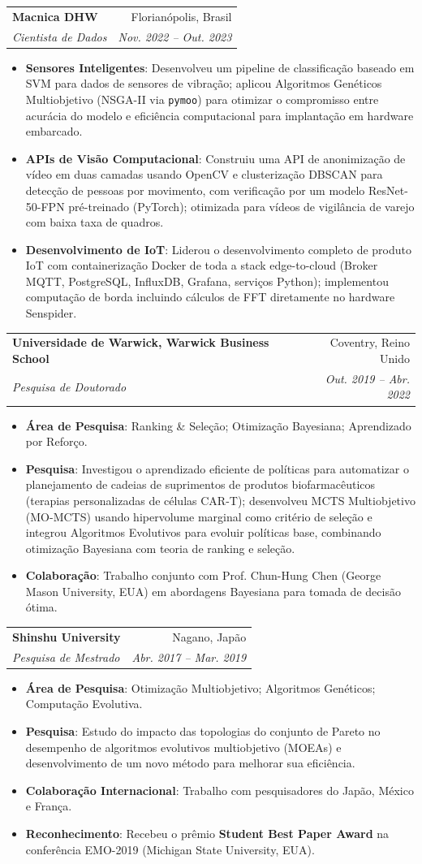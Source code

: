 \documentclass[letterpaper,11pt]{article}
\makeatletter
\newcommand{\resumeItem}[2]{
	\item\small{
		\textbf{#1}{: #2 \vspace{-2pt}}
	}
}
\newcommand{\resumeSubheading}[4]{
	\vspace {-1pt}\item
	\begin{tabular*}{0.97\textwidth}{l@{\extracolsep{\fill}}r}
		\textbf{#1} & #2\\
		\textit{\small#3} & \textit{\small #4} \\
	\end{tabular*}\vspace{-5pt}
}
\newcommand{\resumeItemListStart}{\begin{itemize} }
\newcommand{\resumeItemListEnd}{\end{itemize}\vspace{-5pt}}
\makeatother
\begin{document}
	\resumeSubheading
	{Macnica DHW}{Florianópolis, Brasil}
	{Cientista de Dados}{Nov. 2022 -- Out. 2023}
	\resumeItemListStart
	\resumeItem{Sensores Inteligentes}
	{Desenvolveu um pipeline de classificação baseado em SVM para dados de sensores de vibração; aplicou Algoritmos Genéticos Multiobjetivo (NSGA-II via \texttt{pymoo}) para otimizar o compromisso entre acurácia do modelo e eficiência computacional para implantação em hardware embarcado.}
	\resumeItem{APIs de Visão Computacional}
	{Construiu uma API de anonimização de vídeo em duas camadas usando OpenCV e clusterização DBSCAN para detecção de pessoas por movimento, com verificação por um modelo ResNet-50-FPN pré-treinado (PyTorch); otimizada para vídeos de vigilância de varejo com baixa taxa de quadros.}
	\resumeItem{Desenvolvimento de IoT}
	{Liderou o desenvolvimento completo de produto IoT com containerização Docker de toda a stack edge-to-cloud (Broker MQTT, PostgreSQL, InfluxDB, Grafana, serviços Python); implementou computação de borda incluindo cálculos de FFT diretamente no hardware Senspider.}
	\resumeItemListEnd
	
	\resumeSubheading
	{Universidade de Warwick, Warwick Business School}{Coventry, Reino Unido}
	{Pesquisa de Doutorado}{Out. 2019 -- Abr. 2022}
	\resumeItemListStart
	\resumeItem{Área de Pesquisa}
	{Ranking \& Seleção; Otimização Bayesiana; Aprendizado por Reforço.}
	\resumeItem{Pesquisa}
	{Investigou o aprendizado eficiente de políticas para automatizar o planejamento de cadeias de suprimentos de produtos biofarmacêuticos (terapias personalizadas de células CAR-T); desenvolveu MCTS Multiobjetivo (MO-MCTS) usando hipervolume marginal como critério de seleção e integrou Algoritmos Evolutivos para evoluir políticas base, combinando otimização Bayesiana com teoria de ranking e seleção.}
	\resumeItem{Colaboração}
	{Trabalho conjunto com Prof. Chun-Hung Chen (George Mason University, EUA) em abordagens Bayesiana para tomada de decisão ótima.}
	\resumeItemListEnd

\resumeSubheading
{Shinshu University}{Nagano, Japão}
{Pesquisa de Mestrado}{Abr. 2017 -- Mar. 2019}
\resumeItemListStart
\resumeItem{Área de Pesquisa}
{Otimização Multiobjetivo; Algoritmos Genéticos; Computação Evolutiva.}
\resumeItem{Pesquisa}
{Estudo do impacto das topologias do conjunto de Pareto no desempenho de algoritmos evolutivos multiobjetivo (MOEAs) e desenvolvimento de um novo método para melhorar sua eficiência.}
\resumeItem{Colaboração Internacional}
{Trabalho com pesquisadores do Japão, México e França.}
\resumeItem{Reconhecimento}
{Recebeu o prêmio \textbf{Student Best Paper Award} na conferência EMO-2019 (Michigan State University, EUA).}
\resumeItemListEnd
\end{document}
